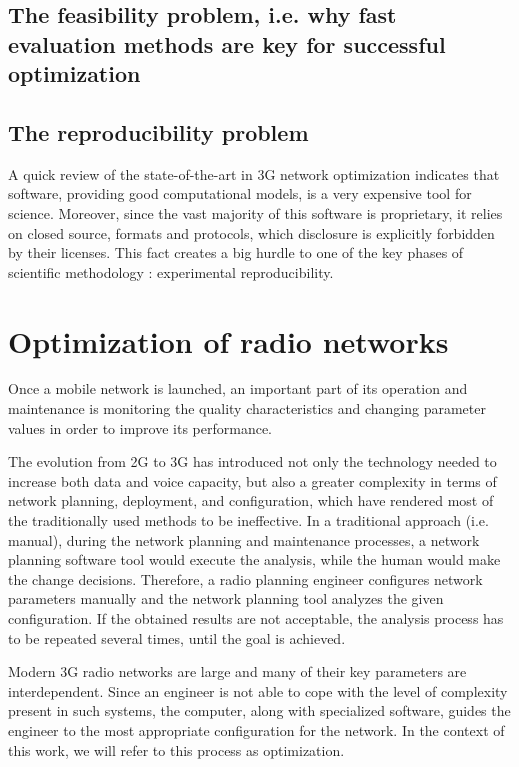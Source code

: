 \subsection{The feasibility problem, i.e. why fast evaluation methods are key
for successful optimization}


\subsection{The reproducibility problem}

A quick review of the state-of-the-art in 3G network optimization
indicates that software, providing good computational models, is a
very expensive tool for science. Moreover, since the vast majority
of this software is proprietary, it relies on closed source, formats
and protocols, which disclosure is explicitly forbidden by their licenses.
This fact creates a big hurdle to one of the key phases of scientific
methodology \cite{gauch2002scientific}: experimental reproducibility.


\section{Optimization of radio networks}

Once a mobile network is launched, an important part of its operation
and maintenance is monitoring the quality characteristics and changing
parameter values in order to improve its performance.

The evolution from 2G to 3G has introduced not only the technology
needed to increase both data and voice capacity, but also a greater
complexity in terms of network planning, deployment, and configuration,
which have rendered most of the traditionally used methods to be ineffective.
In a traditional approach (i.e. manual), during the network planning
and maintenance processes, a network planning software tool would
execute the analysis, while the human would make the change decisions.
Therefore, a radio planning engineer configures network parameters
manually and the network planning tool analyzes the given configuration.
If the obtained results are not acceptable, the analysis process has
to be repeated several times, until the goal is achieved.

Modern 3G radio networks are large and many of their key parameters
are interdependent. Since an engineer is not able to cope with the
level of complexity present in such systems, the computer, along with
specialized software, guides the engineer to the most appropriate
configuration for the network. In the context of this work, we will
refer to this process as optimization.

